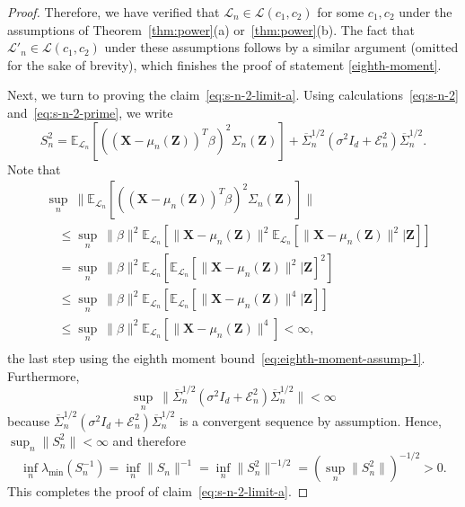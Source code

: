 \documentclass[12pt]{article}
\theoremstyle{definition}
\theoremstyle{remark}
\newcommand{\prx}{\bm X}
\newcommand{\prz}{\bm Z}
\begin{document}
\begin{proof}
	Therefore, we have verified that $\mathcal L_n \in \mathscr L(c_1, c_2)$ for some $c_1, c_2$ under the assumptions of Theorem~\ref{thm:power}(a) or~\ref{thm:power}(b). The fact that $\mathcal L'_n \in \mathscr L(c_1, c_2)$ under these assumptions follows by a similar argument (omitted for the sake of brevity), which finishes the proof of statement \eqref{eighth-moment}.
	
	Next, we turn to proving the claim~\eqref{eq:s-n-2-limit-a}. Using calculations~\eqref{eq:s-n-2} and~\eqref{eq:s-n-2-prime}, we write
	\begin{equation}
	S_n^2 = \mathbb E_{\mathcal L_n}[((\prx - \mu_n(\prz))^T \beta)^2\Sigma_n(\prz)] + \overline \Sigma_n^{1/2}(\sigma^2 I_d + \mathcal E^2_n) \overline \Sigma_n^{1/2}.
\end{equation}
	Note that 
	\begin{equation}
		\begin{split}
			&\sup_n\ \|\mathbb E_{\mathcal L_n}[((\prx - \mu_n(\prz))^T \beta)^2\Sigma_n(\prz)]\| \\
			&\quad\leq \sup_n\ \|\beta\|^2\mathbb E_{\mathcal L_n}[\|\prx - \mu_n(\prz)\|^2\mathbb E_{\mathcal L_n}[\|\prx - \mu_n(\prz)\|^2|\prz]] \\
			&\quad= \sup_n\ \|\beta\|^2\mathbb E_{\mathcal L_n}[\mathbb E_{\mathcal L_n}[\|\prx - \mu_n(\prz)\|^2|\prz]^2] \\
			&\quad\leq \sup_n\ \|\beta\|^2\mathbb E_{\mathcal L_n}[\mathbb E_{\mathcal L_n}[\|\prx - \mu_n(\prz)\|^4|\prz]] \\
			&\quad\leq \sup_n\ \|\beta\|^2\mathbb E_{\mathcal L_n}[\|\prx - \mu_n(\prz)\|^4] < \infty, \\
			\label{eq:boundedness}
		\end{split}
	\end{equation}
	the last step using the eighth moment bound~\eqref{eq:eighth-moment-assump-1}. Furthermore, 
	\begin{equation}
	\sup_n \ \|\overline \Sigma_n^{1/2}(\sigma^2 I_d + \mathcal E^2_n) \overline \Sigma_n^{1/2}\| < \infty
	\end{equation}
	because $\overline \Sigma_n^{1/2}(\sigma^2 I_d + \mathcal E^2_n) \overline \Sigma_n^{1/2}$ is a convergent sequence by assumption. Hence, $\sup_n \|S_n^2\| < \infty$ and therefore
	\begin{equation*}
	\inf_n \lambda_{\min}(S_n^{-1}) = \inf_n \|S_n\|^{-1} = \inf_n \|S_n^2\|^{-1/2} = \left(\sup_n \|S_n^2\|\right)^{-1/2} > 0.
	\end{equation*}
	This completes the proof of claim~\eqref{eq:s-n-2-limit-a}.	
	

\end{proof}
\end{document}
